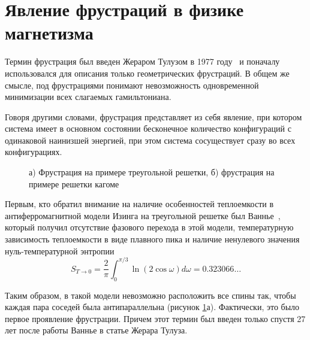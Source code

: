 \section{Явление фрустраций в физике магнетизма}\label{sec:ch1/sec3}

Термин \guillemotleft фрустрация\guillemotright \hspace{1pt} был введен Жераром Тулузом в 1977 году~\cite{toulouse1977, vannimenus1977} и поначалу использовался для описания только геометрических фрустраций. 
В общем же смысле, под фрустрациями понимают невозможность одновременной минимизации всех слагаемых гамильтониана.

Говоря другими словами, фрустрация представляет из себя явление, при котором система имеет в основном состоянии бесконечное количество конфигураций с одинаковой наинизшей энергией, при этом система сосуществует сразу во всех конфигурациях.

 \begin{figure}[h]
 	\begin{minipage}[h]{0.49\linewidth}
 	\end{minipage}
 	\hfill
 	\begin{minipage}[h]{0.49\linewidth}
 	\end{minipage}
 	\caption{а) Фрустрация на примере треугольной решетки, б) фрустрация на примере решетки кагоме}
 	\label{frust1}
 \end{figure}

Первым, кто обратил внимание на наличие особенностей теплоемкости в антиферромагнитной модели Изинга на треугольной решетке был Ваннье~\cite{wannier1950}, который получил отсутствие фазового перехода в этой модели, температурную зависимость теплоемкости в виде плавного пика и наличие ненулевого значения нуль-температурной энтропии 
\begin{equation}
S_{T\rightarrow 0} = \frac{2}{\pi} \int_{0}^{\pi/3} \ln (2 \cos \omega) d\omega = 0.323066\dots
\label{wannier}
\end{equation}

Таким образом, в такой модели невозможно расположить все спины так, чтобы каждая пара соседей была антипараллельна (рисунок \ref{frust1}а). Фактически, это было первое проявление фрустрации. Причем этот термин был введен только спустя 27 лет после работы Ваннье в статье Жерара Тулуза.


